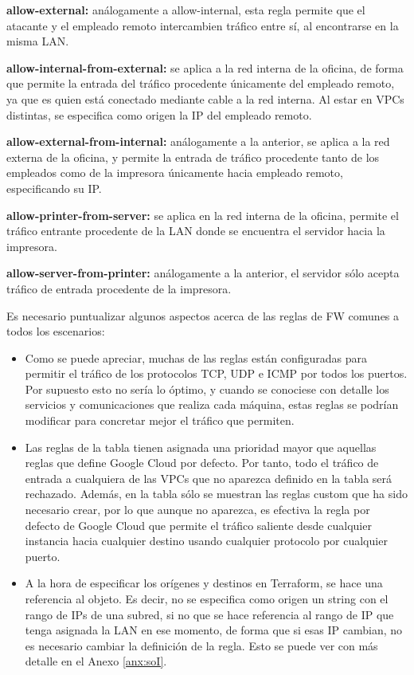   \textbf{allow-external:} análogamente a allow-internal, esta regla permite que el atacante y el empleado remoto intercambien tráfico entre sí, al encontrarse en la misma LAN.

  \textbf{allow-internal-from-external:} se aplica a la red interna de la oficina, de forma que permite la entrada del tráfico procedente únicamente del empleado remoto, ya que es quien está conectado mediante cable a la red interna. Al estar en VPCs distintas, se especifica como origen la IP del empleado remoto. 

  \textbf{allow-external-from-internal:} análogamente a la anterior, se aplica a la red externa de la oficina, y permite la entrada de tráfico procedente tanto de los empleados como de la impresora únicamente hacia empleado remoto, especificando su IP. 

  \textbf{allow-printer-from-server:} se aplica en la red interna de la oficina, permite el tráfico entrante procedente de la LAN donde se encuentra el servidor hacia la impresora.

  \textbf{allow-server-from-printer:} análogamente a la anterior, el servidor sólo acepta tráfico de entrada procedente de la impresora.

  Es necesario puntualizar algunos aspectos acerca de las reglas de FW comunes a todos los escenarios:

  \begin{itemize}
    \item Como se puede apreciar, muchas de las reglas están configuradas para permitir el tráfico de los protocolos TCP, UDP e ICMP por todos los puertos. Por supuesto esto no sería lo óptimo, y cuando se conociese con detalle los servicios y comunicaciones que realiza cada máquina, estas reglas se podrían modificar para  concretar mejor el tráfico que permiten. 

    \item Las reglas de la tabla tienen asignada una prioridad mayor que aquellas reglas que define Google Cloud por defecto. Por tanto, todo el tráfico de entrada a cualquiera de las VPCs que no aparezca definido en la tabla será rechazado. Además, en la tabla sólo se muestran las reglas custom que ha sido necesario crear, por lo que aunque no aparezca, es efectiva la regla por defecto de Google Cloud que permite el tráfico saliente desde cualquier instancia hacia cualquier destino usando cualquier protocolo por cualquier puerto.

    \item A la hora de especificar los orígenes y destinos en Terraform, se hace una referencia al objeto. Es decir, no se especifica como origen un string con el rango de IPs de una subred, si no que se hace referencia al rango de IP que tenga asignada la LAN en ese momento, de forma que si esas IP cambian, no es necesario cambiar la definición de la regla. Esto se puede ver con más detalle en el Anexo \ref{anx:soI}.
  \end{itemize}

